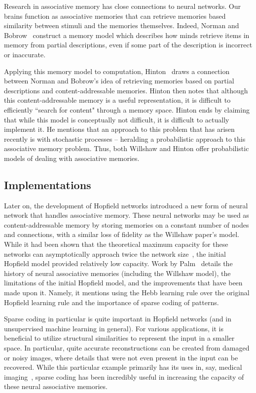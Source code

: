 \documentclass{sig-alternate}
\begin{document}
Research in associative memory has close connections to neural networks. Our brains function as 
associative memories that can retrieve memories based similarity between stimuli and the memories themselves. 
Indeed, Norman and Bobrow~\cite{bobrow} construct a memory model which describes how minds retrieve 
items in memory from partial descriptions, even if some part of the description is incorrect or inaccurate. 

Applying this memory model to computation, Hinton~\cite{hinton} draws a connection between Norman and Bobrow's idea of 
retrieving memories based on partial descriptions and content-addressable memories.
Hinton then notes that although this content-addressable memory is a useful representation,  
it is difficult to efficiently ``search for content" through a memory space. 
Hinton ends by claiming that while this model is conceptually not difficult, it is difficult to actually 
implement it. He mentions that an approach to this problem that has arisen recently is with stochastic processes 
-- heralding a probabilistic approach to this associative memory problem. Thus, both Willshaw and Hinton offer probabilistic models
of dealing with associative memories.

\subsection{Implementations}
\label{subsec:implementations}
Later on, the development of Hopfield networks introduced a new form of neural network
that handles associative memory. These neural networks may be used as content-addressable memory by
storing memories on a constant number of nodes and connections, with a similar loss of 
fidelity as the Willshaw paper's model. While it had been shown that the theoretical maximum capacity for these networks
can asymptotically approach twice the network size~\cite{gardner}, the initial Hopfield model 
provided relatively low capacity. Work by Palm~\cite{palm} details the history of 
neural associative memories (including the Willshaw model), the limitations of the initial Hopfield model, and the improvements
that have been made upon it. Namely, it mentions using the Hebb learning rule over the original
Hopfield learning rule and the importance of sparse coding of patterns. 

Sparse coding in particular is quite important in Hopfield networks (and in unsupervised
machine learning in general). For various applications, it is beneficial to utilize
structural similarities to represent the input in a smaller space. In particular, quite 
accurate reconstructions can be created from damaged or noisy images, where details that were 
not even present in the input can be recovered. While this particular example primarily has its uses in, say, 
medical imaging~\cite{yang}, sparse coding has been incredibly useful in increasing the
capacity of these neural associative memories. 
\end{document}
